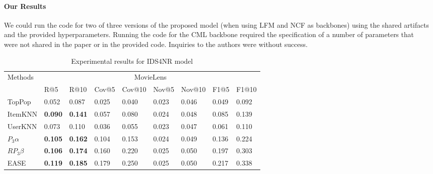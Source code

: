 \documentclass[sigconf,natbib=true,nonacm]{acmart}
\begin{document}
\paragraph{Our Results}
We could run the code for two of three versions of the proposed model (when using LFM and NCF as backbones) using the shared artifacts and the provided hyperparameters. Running the code for the CML backbone required the specification of a number of parameters that were not shared in the paper or in the provided code.
Inquiries to the authors were without success.

\begin{table}[htbp]
    \caption{Experimental results for IDS4NR model}
    \label{tab:idsnr}
    \centering
    \begin{tabular}{l l l l l l l l l}
        \multirow{2}{*}{Methods} & \multicolumn{8}{c}{MovieLens} \\
        ~                        & R@5            & R@10           & Cov@5            & Cov@10          & Nov@5          & Nov@10            & F1@5              & F1@10   \\ \hline
       TopPop                    & 0.052          & 0.087          & 0.025	           & 0.040	         & 0.023	      & 0.046	          & 0.049	          & 0.092 \\
        ItemKNN                  & \textbf{0.090} & \textbf{0.141} & 0.057            & 0.080           & 0.024          & 0.048             & 0.085             & 0.139  \\
        UserKNN                  & 0.073          & 0.110          & 0.036            & 0.055           & 0.023          & 0.047             & 0.061             & 0.110 \\
        $P_{3}\alpha$            & \textbf{0.105} & \textbf{0.162} & 0.104            & 0.153           & 0.024          & 0.049             & 0.136             & 0.224 \\
        $RP_{3}\beta$            & \textbf{0.106} & \textbf{0.174} & 0.160            & 0.220           & 0.025          & 0.050             & 0.197             & 0.303 \\
        EASE                     & \textbf{0.119} & \textbf{0.185} & 0.179            & 0.250           & 0.025          & 0.050             & 0.217             & 0.338 \\ \hline


\end{tabular}
\end{table}
\end{document}
